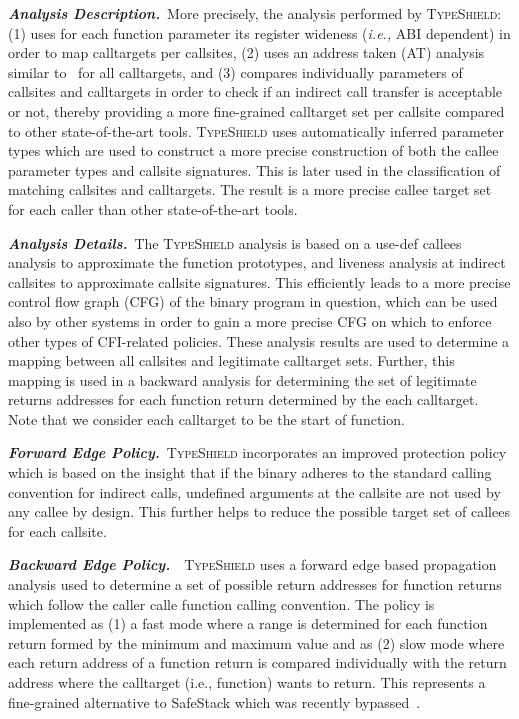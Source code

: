 \textbf{\textit{Analysis Description.}}~More precisely, the analysis performed by \textsc{TypeShield}:
(1) uses for each function parameter its register wideness (\textit{i.e.,} ABI dependent) in order to map calltargets per callsites,  
(2) uses an address taken (AT) analysis similar to~\cite{veen:typearmor} for all calltargets, and 
(3) compares individually parameters of callsites and calltargets in order to check if an indirect call transfer is acceptable or not, 
thereby providing a more fine-grained calltarget set per callsite compared to other state-of-the-art tools.
\textsc{TypeShield} uses automatically inferred parameter types which are used to construct
a more precise construction of both the callee parameter types and callsite signatures. This 
is later used in the classification of matching callsites and calltargets.
The result is a more precise callee target set for each caller than other state-of-the-art tools.

\textbf{\textit{Analysis Details.}}~The \textsc{TypeShield} analysis is based on a use-def callees analysis to approximate the function prototypes, 
and liveness analysis at indirect callsites to approximate callsite signatures. This 
efficiently leads to a more precise control flow graph (CFG) of the binary program in question, 
which can be used also by other systems in order to gain a more precise CFG on which to 
enforce other types of CFI-related policies. These analysis results are used to
determine a mapping between all callsites and legitimate calltarget sets. Further,
this mapping is used in a backward analysis for determining the set of legitimate 
returns addresses for each function return determined by the each calltarget. Note that 
we consider each calltarget to be the start of function.

\textbf{\textit{Forward Edge Policy.}}~\textsc{TypeShield} incorporates an improved protection policy which is
based on the insight that if the binary adheres to the standard calling convention
for indirect calls, undefined arguments at the callsite are not used by any callee by design. 
This further helps to reduce the possible target set of callees for each callsite.

\textbf{\textit{Backward Edge Policy.}}~~\textsc{TypeShield} uses a forward edge based propagation analysis used to determine a 
set of possible return addresses for function returns which follow the caller calle function calling convention.
The policy is implemented as (1) a fast mode where a range is determined for each function return formed by the minimum and maximum value and
as (2) slow mode where each return address of a function return is compared individually with the return address where
the calltarget (i.e., function) wants to return.
This represents a fine-grained alternative to SafeStack which was recently bypassed~\cite{safestack:bypassing}.


